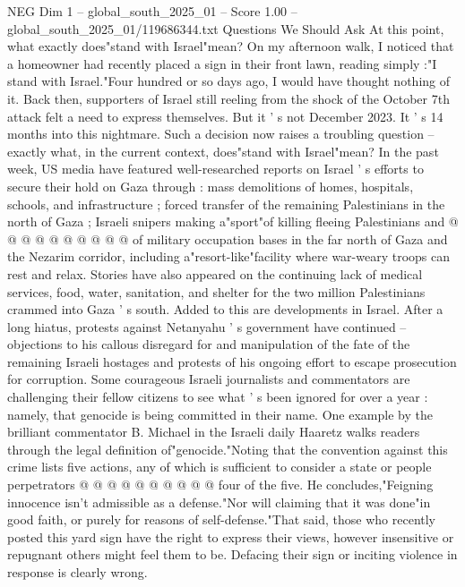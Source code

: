 \begin{textsample}{NEG Dim 1 – global\_south\_2025\_01 – Score 1.00 – global\_south\_2025\_01/119686344.txt}  \label{ex:f1_neg_149}
Questions We Should Ask At this point, what exactly does"stand with Israel"mean?
On my afternoon walk, I noticed that a homeowner had recently placed a sign in their front lawn, reading simply :"I stand with Israel."Four hundred or so days ago, I would have thought nothing of it.
Back then, supporters of Israel still reeling from the shock of the October 7th attack felt a need to express themselves.
But it ' s not December 2023.
It ' s 14 months into this nightmare.
Such a decision now raises a troubling question -- exactly what, in the current context, does"stand with Israel"mean?
In the past week, US media have featured well-researched reports on Israel ' s efforts to secure their hold on Gaza through : mass demolitions of homes, hospitals, schools, and infrastructure ; forced transfer of the remaining Palestinians in the north of Gaza ; Israeli snipers making a"sport"of killing fleeing Palestinians and @ @ @ @ @ @ @ @ @ @ of military occupation bases in the far north of Gaza and the Nezarim corridor, including a"resort-like"facility where war-weary troops can rest and relax.
Stories have also appeared on the continuing lack of medical services, food, water, sanitation, and shelter for the two million Palestinians crammed into Gaza ' s south.
Added to this are developments in Israel.
After a long hiatus, protests against Netanyahu ' s government have continued -- objections to his callous disregard for and manipulation of the fate of the remaining Israeli hostages and protests of his ongoing effort to escape prosecution for corruption.
Some courageous Israeli journalists and commentators are challenging their fellow citizens to see what ' s been ignored for over a year : namely, that genocide is being committed in their name.
One example by the brilliant commentator B.
Michael in the Israeli daily Haaretz walks readers through the legal definition of"genocide."Noting that the convention against this crime lists five actions, any of which is sufficient to consider a state or people perpetrators @ @ @ @ @ @ @ @ @ @ four of the five.
He concludes,"Feigning innocence isn't admissible as a defense."Nor will claiming that it was done"in good faith, or purely for reasons of self-defense."That said, those who recently posted this yard sign have the right to express their views, however insensitive or repugnant others might feel them to be.
Defacing their sign or inciting violence in response is clearly wrong.

\end{textsample}
